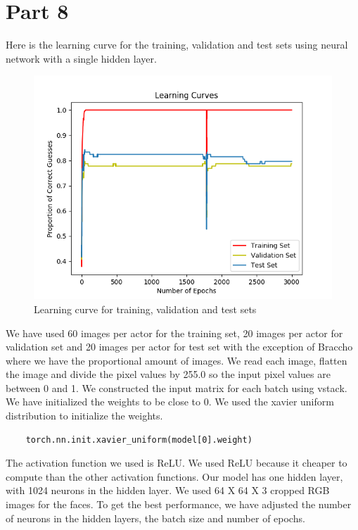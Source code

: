 \documentclass[10pt,letterpaper]{article}
\begin{document}
	\section{Part 8}
	Here is the learning curve for the training, validation and test sets using neural network with a single hidden layer.

	\begin{figure}[H]
		\centering
		\includegraphics[width=\linewidth]{Part8LearningCurve.png}
		\caption{Learning curve for training, validation and test sets}
		\label{fig:pat8}
	\end{figure}

	We have used 60 images per actor for the training set, 20 images per actor for validation set and 20 images per actor for test set with the exception of Braccho where we have the proportional amount of images. We read each image, flatten the image and divide the pixel values by 255.0 so the input pixel values are between 0 and 1. We constructed the input matrix for each batch using vstack. We have initialized the weights to be close to 0. We used the xavier uniform distribution to initialize the weights.
	\begin{lstlisting}
	torch.nn.init.xavier_uniform(model[0].weight)
	\end{lstlisting}

	The activation function we used is ReLU. We used ReLU because it cheaper to compute than the other activation functions. Our model has one hidden layer, with 1024 neurons in the hidden layer. We used 64 X 64 X 3 cropped RGB images for the faces. To get the best performance, we have adjusted the number of neurons in the hidden layers, the batch size and number of epochs.
\end{document}
